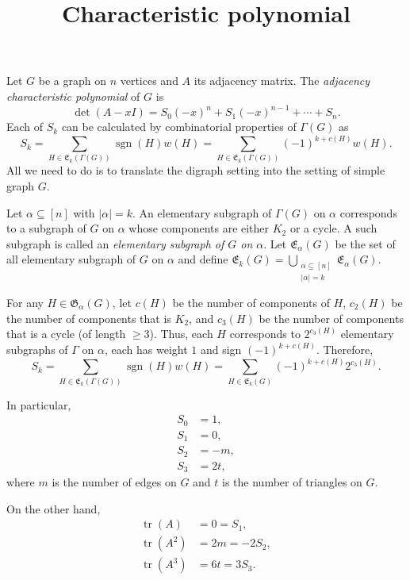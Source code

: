 \documentclass{article}
\title{Characteristic polynomial}
\date{\vspace{-1cm}}
\newcommand{\tr}{\operatorname{tr}}
\newcommand{\sgn}{\operatorname{sgn}}
\theoremstyle{definition}
\begin{document}
\maketitle
\large

Let $G$ be a graph on $n$ vertices and $A$ its adjacency matrix.  The \emph{adjacency characteristic polynomial} of $G$ is 
\[\det(A - xI) = S_0(-x)^n + S_1(-x)^{n-1} + \cdots + S_n.\]
Each of $S_k$ can be calculated by combinatorial properties of $\Gamma(G)$ as
\[S_k = \sum_{H\in\mathfrak{E}_k(\Gamma(G))} \sgn(H)w(H) = \sum_{H\in\mathfrak{E}_k(\Gamma(G))}(-1)^{k+c(H)}w(H).\]
All we need to do is to translate the digraph setting into the setting of simple graph $G$.  

Let $\alpha\subseteq[n]$ with $|\alpha| = k$.  An elementary subgraph of $\Gamma(G)$ on $\alpha$ corresponds to a subgraph of $G$ on $\alpha$ whose components are either $K_2$ or a cycle.  A such subgraph is called an \emph{elementary subgraph of $G$ on $\alpha$}.  Let $\mathfrak{E}_\alpha(G)$ be the set of all elementary subgraph of $G$ on $\alpha$ and define $\mathfrak{E}_k(G) = \bigcup_{\substack{\alpha\subseteq [n]\\|\alpha| = k}}\mathfrak{E}_\alpha(G)$.    

For any $H\in\mathfrak{G}_\alpha(G)$, let $c(H)$ be the number of components of $H$, $c_2(H)$ be the number of components that is $K_2$, and $c_3(H)$ be the number of components that is a cycle (of length $\geq 3$).  Thus, each $H$ corresponds to $2^{c_3(H)}$ elementary subgraphs of $\Gamma$ on $\alpha$, each has weight $1$ and sign $(-1)^{k + c(H)}$.  Therefore, 
\[S_k = \sum_{H\in\mathfrak{E}_k(\Gamma(G))} \sgn(H)w(H) = \sum_{H\in\mathfrak{E}_k(G)}(-1)^{k+c(H)}2^{c_3(H)}.\]

In particular, 
\[\begin{aligned}
S_0 &= 1, \\
S_1 &= 0, \\
S_2 &= -m, \\
S_3 &= 2t,
\end{aligned}\]
where $m$ is the number of edges on $G$ and $t$ is the number of triangles on $G$.

On the other hand, 
\[\begin{aligned}
\tr(A) &= 0 = S_1, \\
\tr(A^2) &= 2m = -2S_2, \\
\tr(A^3) &= 6t = 3S_3.
\end{aligned}\]
\end{document}
